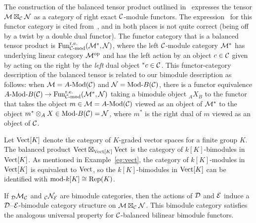 \documentclass{amsart}
\begin{document}
\begin{remark}
The construction of the balanced tensor product outlined in~\cite{MR3107567} expresses the tensor $\mathcal M \boxtimes_{\mathcal C} \mathcal N$ as a category of right exact $\mathcal C$-module functors.  The expression~\cite[Eq~13]{MR3107567} for this functor category is cited from~\cite{0909.3140}, and in both places is not quite correct (being off by a twist by a double dual functor).  The functor category that is a balanced tensor product is $\mathrm{Fun}_{\mathcal C\textrm{-}\mathrm{mod}}^{\mathrm{r.e.}}(\mathcal M^{\ast},\mathcal N)$, where the left $\mathcal C$-module category $\mathcal M^{\ast}$ has underlying linear category $\mathcal M^{\mathrm{op}}$ and has the left action by an object $c \in \mathcal C$ given by acting on the right by the \emph{left} dual object ${}^{\ast} c \in \mathcal C$.  This functor-category description of the balanced tensor is related to our bimodule description as follows: when $\cM = \Mod{A}{}(\cC)$ and $\cN = \Mod{}{B}(\cC)$, there is a functor equivalence $\Mod{A}{B}(\cC) \ra \mathrm{Fun}_{\cC\textrm{-}\mathrm{mod}}^{\mathrm{r.e.}}(\cM^{\ast},\cN)$ taking a bimodule object ${}_A X_B$ to the functor that takes the object $m \in \cM = \Mod{A}{}(\cC)$ viewed as an object of $\mathcal M^{\ast}$ to the object $m^\ast \otimes_A X \in \Mod{}{B}(\cC) = \cN$, where $m^\ast$ is the right dual of $m$ viewed as an object of $\mathcal C$.
\end{remark}

\begin{example}
Let $\mathrm{Vect}[K]$ denote the category of $K$-graded vector spaces for a finite group $K$.  The balanced product $\mathrm{Vect} \boxtimes_{\mathrm{Vect}[K]} \mathrm{Vect}$ is the category of $k[K]$-bimodules in $\mathrm{Vect}[K]$. As mentioned in Example~\ref{eg:vect}, the category of $k[K]$-modules in $\mathrm{Vect}[K]$ is equivalent to $\mathrm{Vect}$, so the $k[K]$-bimodules in $\mathrm{Vect}[K]$ can be identified with $\text{mod-}k[K] \cong \mathrm{Rep}(K)$.
\end{example}

\begin{remark}
	If ${}_{\mathcal D}\mathcal M_{\mathcal C}$ and ${}_{\mathcal C}\mathcal N_{\mathcal E}$ are bimodule categories, then the actions of $\mathcal D$ and $\mathcal E$ induce a $\mathcal D$--$\mathcal E$-bimodule category structure on $\mathcal M \boxtimes_{\mathcal C} \mathcal N$. This bimodule category satisfies the analogous universal property for $\mathcal C$-balanced bilinear bimodule functors.
\end{remark}

\end{document}
